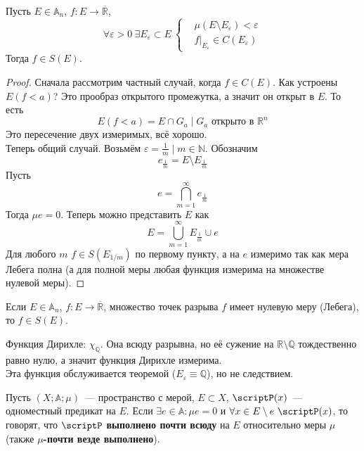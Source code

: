 \documentclass{article}
\let\eps\varepsilon
\begin{document}
    \begin{theorem}
        \label{Непрерывность и измеримость по Лебегу}
        Пусть $E\in\mathbb A_n$, $f\colon E\to\overline{\mathbb R}$,
        $$\forall\eps>0~\exists E_\eps\subset E~\left\{\begin{aligned}
            &\mu(E\setminus E_\eps)<\eps\\
            &f\big|_{E_\eps}\in C(E_\eps)
        \end{aligned}\right.$$
        Тогда $f\in S(E)$.
    \end{theorem}
    \begin{proof}
        Сначала рассмотрим частный случай, когда $f\in C(E)$. Как устроены $E(f<a)$? Это прообраз открытого промежутка, а значит он открыт в $E$. То есть
        $$
        E(f<a)=E\cap G_a\mid G_a\text{ открыто в }\mathbb R^n
        $$
        Это пересечение двух измеримых, всё хорошо.\\
        Теперь общий случай. Возьмём $\eps=\frac1m\mid m\in\mathbb N$. Обозначим
        $$e_{\frac 1m}=E\setminus E_{\frac1m}$$
        Пусть
        $$e=\bigcap\limits_{m=1}^\infty e_{\frac 1m}$$
        Тогда $\mu e=0$. Теперь можно представить $E$ как
        $$
        E=\bigcup\limits_{m=1}^\infty E_{\frac1m}\cup e
        $$
        Для любого $m$ $f\in S(E_{1/m})$ по первому пункту, а на $e$ измеримо так как мера Лебега полна (а для полной меры любая функция измерима на множестве нулевой меры).
    \end{proof}
    \begin{corollary}
        Если $E\in\mathbb A_n$, $f\colon E\to\overline{\mathbb R}$, множество точек разрыва $f$ имеет нулевую меру (Лебега), то $f\in S(E)$.
    \end{corollary}
    \begin{example}
        Функция Дирихле: $\chi_{\mathbb Q}$. Она всюду разрывна, но её сужение на $\mathbb R\setminus\mathbb Q$ тождественно равно нулю, а значит функция Дирихле измерима.\\
        Эта функция обслуживается теоремой ($E_\eps\equiv\mathbb Q$), но не следствием.
    \end{example}
    \begin{definition}
        Пусть $(X;\mathbb A;\mu)$~--- пространство с мерой, $E\subset X$, $\scriptP(x)$~--- одноместный предикат на $E$. Если $\exists e\in\mathbb A:\mu e=0$ и $\forall x\in E\setminus e~\scriptP(x)$, то говорят, что $\scriptP$ \textbf{выполнено почти всюду} на $E$ относительно меры $\mu$ (также \textbf{$\mu$-почти везде выполнено}).
    \end{definition}
\end{document}
